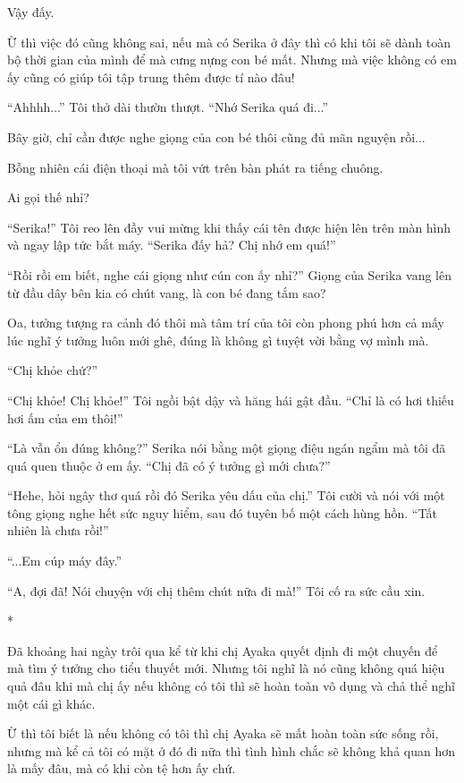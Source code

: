 {Vậy đấy.

Ừ thì việc đó cũng không sai, nếu mà có Serika ở đây thì có khi tôi sẽ
dành toàn bộ thời gian của mình để mà cưng nựng con bé mất. Nhưng mà
việc không có em ấy cũng có giúp tôi tập trung thêm được tí nào đâu!

``Ahhhh...'' Tôi thở dài thườn thượt. ``Nhớ Serika quá đi...''

Bây giờ, chỉ cần được nghe giọng của con bé thôi cũng đủ mãn nguyện
rồi...

Bỗng nhiên cái điện thoại mà tôi vứt trên bàn phát ra tiếng chuông.

Ai gọi thế nhỉ?

``Serika!'' Tôi reo lên đầy vui mừng khi thấy cái tên được hiện lên trên
màn hình và ngay lập tức bắt máy. ``Serika đấy hả? Chị nhớ em quá!''

``Rồi rồi em biết, nghe cái giọng như cún con ấy nhỉ?'' Giọng của Serika
vang lên từ đầu dây bên kia có chút vang, là con bé đang tắm sao?

Oa, tưởng tượng ra cảnh đó thôi mà tâm trí của tôi còn phong phú hơn cả
mấy lúc nghĩ ý tưởng luôn mới ghê, đúng là không gì tuyệt vời bằng vợ
mình mà.

``Chị khỏe chứ?''

``Chị khỏe! Chị khỏe!'' Tôi ngồi bật dậy và hăng hái gật đầu. ``Chỉ là
có hơi thiếu hơi ấm của em thôi!''

``Là vẫn ổn đúng không?'' Serika nói bằng một giọng điệu ngán ngẩm mà
tôi đã quá quen thuộc ở em ấy. ``Chị đã có ý tưởng gì mới chưa?''

``Hehe, hỏi ngây thơ quá rồi đó Serika yêu dấu của chị.'' Tôi cười và
nói với một tông giọng nghe hết sức nguy hiểm, sau đó tuyên bố một cách
hùng hồn. ``Tất nhiên là chưa rồi!''

``...Em cúp máy đây.''

``A, đợi đã! Nói chuyện với chị thêm chút nữa đi mà!'' Tôi cố ra sức cầu
xin.

*

Đã khoảng hai ngày trôi qua kể từ khi chị Ayaka quyết định đi một chuyến
để mà tìm ý tưởng cho tiểu thuyết mới. Nhưng tôi nghĩ là nó cũng không
quá hiệu quả đâu khi mà chị ấy nếu không có tôi thì sẽ hoàn toàn vô dụng
và chả thể nghĩ một cái gì khác.

Ừ thì tôi biết là nếu không có tôi thì chị Ayaka sẽ mất hoàn toàn sức
sống rồi, nhưng mà kể cả tôi có mặt ở đó đi nữa thì tình hình chắc sẽ
không khả quan hơn là mấy đâu, mà có khi còn tệ hơn ấy chứ.

}
